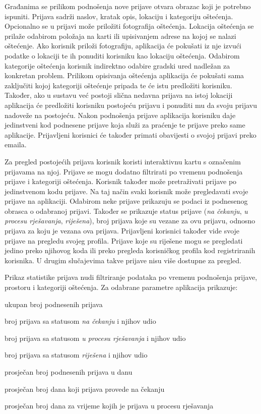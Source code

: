 		Građanima se prilikom podnošenja nove prijave otvara obrazac koji je potrebno ispuniti. Prijava sadrži naslov, kratak opis, lokaciju i kategoriju oštećenja. Opcionalno se u prijavi može priložiti fotografija oštećenja. Lokacija oštećenja se prilaže odabirom položaja na karti ili upisivanjem adrese na kojoj se nalazi oštećenje. Ako korisnik priloži fotografiju, aplikacija će pokušati iz nje izvući podatke o lokaciji te ih ponuditi korisniku kao lokaciju oštećenja. Odabirom kategorije oštećenja korisnik indirektno odabire gradski ured nadležan za konkretan problem. Prilikom opisivanja oštećenja aplikacija će pokušati sama zaključiti kojoj kategoriji oštećenje pripada te će istu predložiti korisniku. Također, ako u sustavu već postoji slična nedavna prijava na istoj lokaciji aplikacija će predložiti korisniku postojeću prijavu i ponuditi mu da svoju prijavu nadoveže na postojeću. Nakon podnošenja prijave aplikacija korisniku daje jedinstveni kod podnesene prijave koja služi za praćenje te prijave preko same aplikacije. Prijavljeni korisnici će također primati obavijesti o svojoj prijavi preko emaila.
		
		Za pregled postojećih prijava korisnik koristi interaktivnu kartu s označenim prijavama na njoj. Prijave se mogu dodatno filtrirati po vremenu podnošenja prijave i kategoriji oštećenja. Korisnik također može pretraživati prijave po jedinstvenom kodu prijave. Na taj način svaki korisnik može pregledavati svoje prijave na aplikaciji. Odabirom neke prijave prikazuju se podaci iz podnesenog obrasca o odabranoj prijavi. Također se prikazuje status prijave (\textit{na čekanju}, \textit{u procesu rješavanja}, \textit{riješena}), broj prijava koje su vezane za ovu prijavu, odnosno prijava za koju je vezana ova prijava. Prijavljeni korisnici također vide svoje prijave na pregledu svojeg profila. Prijave koje su riješene mogu se pregledati jedino preko njihovog koda ili preko pregleda korisničkog profila kod registriranih korisnika. U drugim slučajevima takve prijave nisu više dostupne za pregled.
		
		Prikaz statistike prijava nudi filtriranje podataka po vremenu podnošenja prijave, prostoru i kategoriji oštećenja. Za odabrane parametre aplikacija prikazuje:
		\begin{packed_item} 
			\item ukupan broj podnesenih prijava
			\item broj prijava sa statusom \textit{na čekanju} i njihov udio
			\item broj prijava sa statusom \textit{u procesu rješavanja} i njihov udio
			\item broj prijava sa statusom \textit{riješena} i njihov udio
			\item prosječan broj podnesenih prijava u danu
			\item prosječan broj dana koji prijava provede na čekanju
			\item prosječan broj dana za vrijeme kojih je prijava u procesu rješavanja
		\end{packed_item}
		
